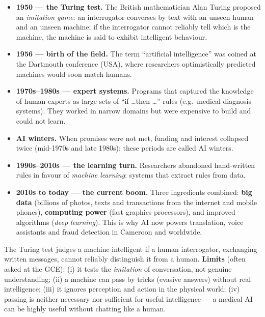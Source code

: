 \documentclass[11pt]{article}
\newcommand{\cle}[1]{{\popxbold\color{popdark}#1}}
\begin{document}
\begin{itemize}
\item \textbf{1950 --- the Turing test.} The British mathematician Alan Turing proposed an \emph{imitation game}: an interrogator converses by text with an unseen human and an unseen machine; if the interrogator cannot reliably tell which is the machine, the machine is said to exhibit intelligent behaviour.
\item \textbf{1956 --- birth of the field.} The term ``artificial intelligence'' was coined at the Dartmouth conference (USA), where researchers optimistically predicted machines would soon match humans.
\item \textbf{1970s--1980s --- expert systems.} Programs that captured the knowledge of human experts as large sets of ``if \dots then \dots'' rules (e.g.\ medical diagnosis systems). They worked in narrow domains but were expensive to build and could not learn.
\item \textbf{AI winters.} When promises were not met, funding and interest collapsed twice (mid-1970s and late 1980s): these periods are called \cle{AI winters}.
\item \textbf{1990s--2010s --- the learning turn.} Researchers abandoned hand-written rules in favour of \emph{machine learning}: systems that extract rules from data.
\item \textbf{2010s to today --- the current boom.} Three ingredients combined: \textbf{big data} (billions of photos, texts and transactions from the internet and mobile phones), \textbf{computing power} (fast graphics processors), and improved algorithms (\emph{deep learning}). This is why AI now powers translation, voice assistants and fraud detection in Cameroon and worldwide.
\end{itemize}

\begin{aretenir}
The \cle{Turing test} judges a machine intelligent if a human interrogator, exchanging written messages, cannot reliably distinguish it from a human. \textbf{Limits} (often asked at the GCE): (i) it tests the \emph{imitation} of conversation, not genuine understanding; (ii) a machine can pass by tricks (evasive answers) without real intelligence; (iii) it ignores perception and action in the physical world; (iv) passing is neither necessary nor sufficient for useful intelligence --- a medical AI can be highly useful without chatting like a human.
\end{aretenir}
\end{document}
